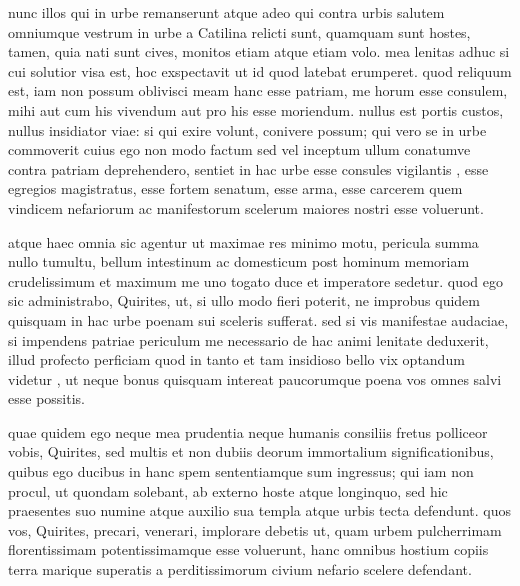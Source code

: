  nunc illos qui in urbe remanserunt atque adeo qui contra urbis salutem omniumque vestrum in urbe a Catilina relicti sunt, quamquam sunt hostes, tamen, quia nati sunt cives, monitos etiam atque etiam volo. mea lenitas adhuc si cui solutior visa est, hoc exspectavit ut id quod latebat erumperet. quod reliquum est, iam non possum oblivisci meam hanc esse patriam, me horum esse consulem, mihi aut cum his vivendum aut pro his esse moriendum. nullus est portis custos, nullus insidiator viae: si qui exire volunt, conivere possum; qui vero se in urbe commoverit cuius ego non modo factum sed vel inceptum ullum conatumve contra patriam deprehendero, sentiet in hac urbe esse consules vigilantis , esse egregios magistratus, esse fortem senatum, esse arma, esse carcerem quem vindicem nefariorum ac manifestorum scelerum maiores nostri esse voluerunt.

 atque haec omnia sic agentur ut maximae res minimo motu, pericula summa nullo tumultu, bellum intestinum ac domesticum post hominum memoriam crudelissimum et maximum me uno togato duce et imperatore sedetur. quod ego sic administrabo, Quirites, ut, si ullo modo fieri poterit, ne improbus quidem quisquam in hac urbe poenam sui sceleris sufferat. sed si vis manifestae audaciae, si impendens patriae periculum me necessario de hac animi lenitate deduxerit, illud profecto perficiam quod in tanto et tam insidioso bello vix optandum videtur , ut neque bonus quisquam intereat paucorumque poena vos omnes salvi esse possitis.

 quae quidem ego neque mea prudentia neque humanis consiliis fretus polliceor vobis, Quirites, sed multis et non dubiis deorum immortalium significationibus, quibus ego ducibus in hanc spem sententiamque sum ingressus; qui iam non procul, ut quondam solebant, ab externo hoste atque longinquo, sed hic praesentes suo numine atque auxilio sua templa atque urbis tecta defendunt. quos vos, Quirites, precari, venerari, implorare debetis ut, quam urbem pulcherrimam florentissimam potentissimamque esse voluerunt, hanc omnibus hostium copiis terra marique superatis a perditissimorum civium nefario scelere defendant.
